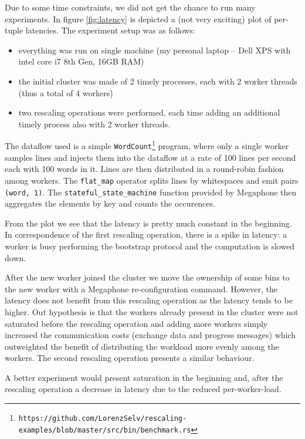 \documentclass[12pt]{extarticle}
\begin{document}
Due to some time constraints, we did not get the chance to run many experiments. In figure \ref{fig:latency} is depicted
a (not very exciting) plot of per-tuple latencies. The experiment setup was as follows:
\begin{itemize}
    \item everything was run on single machine (my personal laptop -- Dell XPS with intel core i7 8th Gen, 16GB RAM)
    \item the initial cluster was made of 2 timely processes, each with 2 worker threads (thus a total of 4 workers)
    \item two rescaling operations were performed, each time adding an additional timely process also with 2 worker threads.
\end{itemize}

The dataflow used is a simple \verb|WordCount|\footnote{\verb|https://github.com/LorenzSelv/rescaling-examples/blob/master/src/bin/benchmark.rs|} program, where only a single worker samples lines and injects them into the dataflow at a rate of 100 lines per second each with 100 words in it.
Lines are then distributed in a round-robin fashion among workers. The \verb|flat_map| operator splits lines by
whitespaces and emit pairs \verb|(word, 1)|. The \verb|stateful_state_machine| function provided by Megaphone then aggregates the elements by key and counts the occurences.

\vspace{3mm}

From the plot we see that the latency is pretty much constant in the beginning. In correspondence of the first rescaling operation,
there is a spike in latency: a worker is busy performing the bootstrap protocol and the computation is slowed down.

After the new worker joined the cluster we move the ownership of some bins to the new worker with a Megaphone re-configuration command.
However, the latency does not benefit from this rescaling operation as the latency tends to be higher. Out hypothesis is that
the workers already present in the cluster were not saturated before the rescaling operation and adding more workers simply 
increased the communication costs (exchange data and progress messages) which outweighted the benefit of distributing
the workload more evenly among the workers. The second rescaling operation presents a similar behaviour.

A better experiment would present saturation in the beginning and, after the rescaling operation a decrease in latency due to the reduced per-worker-load.
\end{document}
